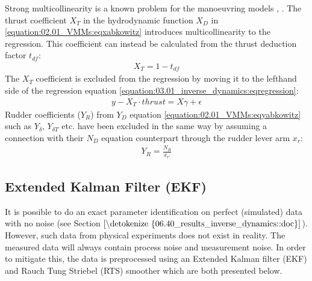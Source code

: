 \documentclass[review]{elsarticle}
\begin{document}
\sphinxAtStartPar
Strong multicollinearity is a known problem for the manoeuvring models \cite{luo_parameter_2016}, \cite{wang_quantifying_2018}.
The thrust coefficient \(X_T\) in the hydrodynamic function \(X_D\) in \autoref{equation:02.01_VMMs:eqxabkowitz} introduces multicollinearity to the regression. This coefficient can instead be calculated from the thrust deduction factor \(t_{df}\):
\begin{equation}\label{equation:03.01_inverse_dynamics:eqXthrust}
\begin{split}\displaystyle X_{T} = 1 - t_{df}\end{split}
\end{equation}
\sphinxAtStartPar
The \(X_T\) coefficient is excluded from the regression by moving it to the left\sphinxhyphen{}hand side of the regression equation \autoref{equation:03.01_inverse_dynamics:eqregression}:
\begin{equation}\label{equation:03.01_inverse_dynamics:eqexclude}
\begin{split}y-X_T \cdot thrust = X \gamma + \epsilon\end{split}
\end{equation}
\sphinxAtStartPar
Rudder coefficients (\(Y_R\)) from \(Y_D\) equation \autoref{equation:02.01_VMMs:eqyabkowitz} such as \(Y_{\delta}\), \(Y_{\delta T}\) etc. have been excluded in the same way by assuming a connection with their \(N_D\) equation counterpart through the rudder lever arm \(x_r\):
\begin{equation}\label{equation:03.01_inverse_dynamics:eqyr}
\begin{split}\displaystyle Y_{R} = \frac{N_{R}}{x_{r'}}\end{split}
\end{equation}

\subsection{Extended Kalman Filter (EKF)}
\label{\detokenize{04.01_EK:extended-kalman-filter-ekf}}\label{\detokenize{04.01_EK::doc}}
\sphinxAtStartPar
It is possible to do an exact parameter identification on perfect (simulated) data with no noise (see Section \(\ref{\detokenize{06.40_results_inverse_dynamics::doc}}\)). However, such data from physical experiments does not exist in reality. The measured data will always contain process noise and measurement noise. In order to mitigate this, the data is preprocessed using an Extended Kalman filter (EKF) and Rauch Tung Striebel (RTS) smoother which are both presented below.
\end{document}
